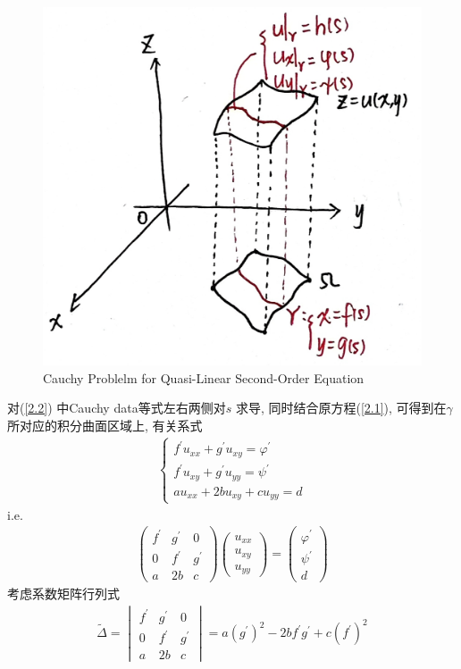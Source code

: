 	\newpage

	\begin{figure}[thbp!]
		\centering
		\includegraphics[width=0.45\linewidth]{figure/2.1-1}
		\caption{Cauchy Problelm for Quasi-Linear Second-Order Equation}
		\label{pic : 2.1-1} %
	\end{figure}

	对(\ref{2.2}) 中Cauchy data等式左右两侧对$s$ 求导, 同时结合原方程(\ref{2.1}), 可得到在$\gamma$ 所对应的积分曲面区域上, 有关系式
	\begin{align*}
		\begin{cases}
			f^{'} u_{xx} + g^{'} u_{xy} = \varphi^{'} \\
			f^{'} u_{xy} + g^{'} u_{yy} = \psi^{'} \\
			au_{xx} + 2bu_{xy} + cu_{yy} = d
		\end{cases}
	\end{align*}
	i.e.
	\begin{align*}
		\begin{pmatrix}
			f^{'} &g^{'} &0 \\
			0 &f^{'} &g^{'} \\
			a &2b &c
		\end{pmatrix}
		\begin{pmatrix}
			u_{xx} \\
			u_{xy} \\
			u_{yy}
		\end{pmatrix} 
		= 
		\begin{pmatrix}
			\varphi^{'} \\
			\psi^{'} \\
			d
		\end{pmatrix}
	\end{align*}
	考虑系数矩阵行列式
	\begin{align*}
		\widetilde{\Delta} = 
		\begin{vmatrix}
			f^{'} &g^{'} &0 \\
			0 &f^{'} &g^{'} \\
			a &2b &c
		\end{vmatrix}
		= a(g^{'})^2 - 2b f^{'} g^{'} + c(f^{'})^2
	\end{align*}
	
